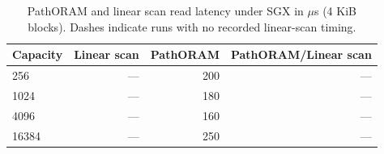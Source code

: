 \begin{table}
\centering
\begin{tabular}{lrrr}
\toprule
Capacity & Linear scan & PathORAM & PathORAM/Linear scan \\
\midrule
256 & --- & 200 & --- \\
1024 & --- & 180 & --- \\
4096 & --- & 160 & --- \\
16384 & --- & 250 & --- \\
\bottomrule
\end{tabular}
\caption{PathORAM and linear scan read latency under SGX in ${}\mu$s (4 KiB blocks). Dashes indicate runs with no recorded linear-scan timing.}
\label{tab:reproduction-table6}
\end{table}
